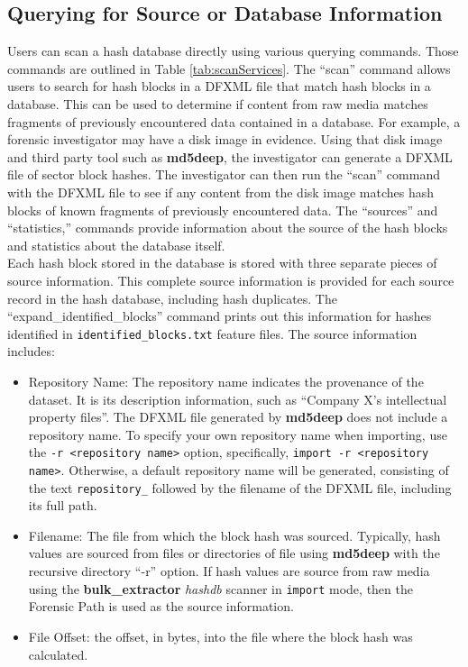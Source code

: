 \documentclass[11pt,fleqn]{article} %
\begin{document}
\subsection{Querying for Source or Database Information}
 Users can scan a hash database directly using various querying commands. Those commands are outlined in Table \ref{tab:scanServices}.  The ``scan'' command allows users to search for hash blocks in a DFXML file that match hash blocks in a database. This can be used to determine if content from raw media matches fragments of previously encountered data contained in a database. For example, a forensic investigator may have a disk image in evidence. Using that disk image and third party tool such as \textbf{md5deep}, the investigator can generate a DFXML file of sector block hashes. The investigator can then run the ``scan'' command with the DFXML file to see if any content from the disk image matches hash blocks of known fragments of previously encountered data. The ``sources'' and ``statistics,'' commands provide information about the source of the hash blocks and statistics about the database itself.\\

Each hash block stored in the database is stored with three separate pieces of source information. This complete source information is provided for each source record in the hash database, including hash duplicates. The ``expand\_identified\_blocks'' command prints out this information for hashes identified in \texttt{identified\_blocks.txt} feature files. The source information includes:
\begin{itemize}
\item Repository Name:
The repository name indicates the provenance of the dataset.
It is its description information,
such as ``Company X's intellectual property files''.
The DFXML file generated by \textbf{md5deep} does not include a repository name.
To specify your own repository name when importing,
use the \texttt{-r <repository name>} option,
specifically, \texttt{import -r <repository name>}.
Otherwise, a default repository name will be generated,
consisting of the text \texttt{repository\_}
followed by the filename of the DFXML file, including its full path.
\item Filename: The file from which the block hash was sourced. Typically, hash values are sourced from files or directories of file using \textbf{md5deep} with the recursive directory ``-r'' option. If hash values are source from raw media using the \textbf{bulk\_extractor} \textit{hashdb} scanner in \texttt{import} mode, then the Forensic Path is used as the source information.
\item File Offset: the offset, in bytes, into the file where the block hash was calculated.
\end{itemize}
\end{document}
